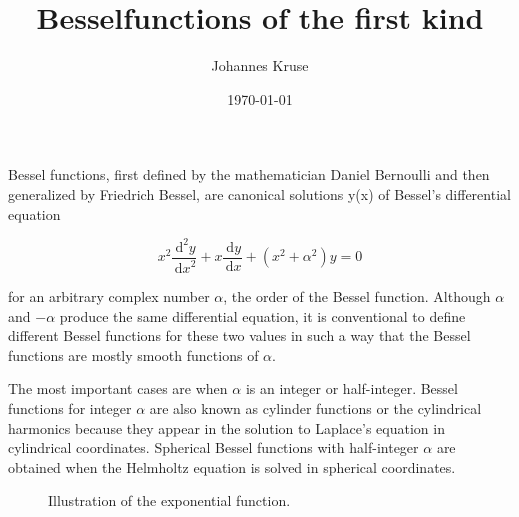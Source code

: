 \documentclass[english,a4paper,twocolumn,article,10pt]{memoir}
\title{Besselfunctions of the first kind}
\author{Johannes Kruse}
\date{\today}
\newcommand\dx[1]{\,\text{d}#1}
\begin{document}
\maketitle

Bessel functions, first defined by the mathematician Daniel Bernoulli and then generalized by Friedrich Bessel, are canonical solutions y(x) of Bessel's differential equation


\begin{equation}
x^2 \frac{{\dx{}}^2 y}{{\dx{x}}^2} + x \frac{\dx{} y}{\dx{x}} + (x^2 + {\alpha}^2) y = 0
\end{equation}

for an arbitrary complex number $\alpha$, the order of the Bessel function. Although $\alpha$ and −$\alpha$ produce the same differential equation, it is conventional to define different Bessel functions for these two values in such a way that the Bessel functions are mostly smooth functions of $\alpha$.

The most important cases are when $\alpha$ is an integer or half-integer. Bessel functions for integer $\alpha$ are also known as cylinder functions or the cylindrical harmonics because they appear in the solution to Laplace's equation in cylindrical coordinates. Spherical Bessel functions with half-integer $\alpha$ are obtained when the Helmholtz equation is solved in spherical coordinates.

\begin{figure}[h]
	
	\caption{Illustration of the exponential function.}
\end{figure}
\end{document}

